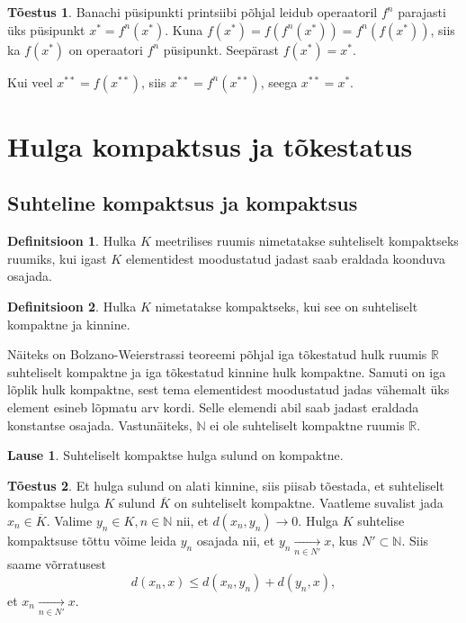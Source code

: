 \documentclass{article}[12pt]
\newcommand{\R}{\mathbb{R}}
\newcommand{\N}{\mathbb{N}}
\theoremstyle{definition}
\newtheorem{definition}{Definitsioon}[section]
\theoremstyle{definition}
\theoremstyle{definition}
\newtheorem{lause}{Lause}[section]
\theoremstyle{break}
\newtheorem*{toestus}{Tõestus}
\begin{document}
\begin{toestus}
	Banachi püsipunkti printsiibi põhjal leidub operaatoril $f^n$ parajasti üks püsipunkt $x^* = f^n(x^*)$.
	Kuna $f(x^*) = f(f^n(x^*)) = f^n(f(x^*))$, siis ka $f(x^*)$ on operaatori $f^n$ püsipunkt. Seepärast $f(x^*) = x^*$.

	Kui veel $x^{**} = f(x^{**})$, siis $x^{**} = f^n(x^{**})$, seega $x^{**} = x^*$.
\end{toestus}

\section{Hulga kompaktsus ja tõkestatus}

\subsection{Suhteline kompaktsus ja kompaktsus}

\begin{definition}
	Hulka $K$ meetrilises ruumis nimetatakse suhteliselt kompaktseks ruumiks, kui igast $K$ elementidest moodustatud jadast saab eraldada koonduva osajada.
\end{definition}

\begin{definition}
	Hulka $K$ nimetatakse kompaktseks, kui see on suhteliselt kompaktne ja kinnine.
\end{definition}

Näiteks on Bolzano-Weierstrassi teoreemi põhjal iga tõkestatud hulk ruumis $\R$ suhteliselt kompaktne ja iga tõkestatud kinnine hulk kompaktne. Samuti on iga lõplik hulk kompaktne, sest tema elementidest moodustatud jadas vähemalt üks element esineb lõpmatu arv kordi. Selle elemendi abil saab jadast eraldada konstantse osajada. Vastunäiteks, $\N$ ei ole suhteliselt kompaktne ruumis $\R$.

\begin{lause}
	Suhteliselt kompaktse hulga sulund on kompaktne.
\end{lause}

\begin{toestus}
	Et hulga sulund on alati kinnine, siis piisab tõestada, et suhteliselt kompaktse hulga $K$ sulund $\overline{K}$ on suhteliselt kompaktne.
	Vaatleme suvalist jada $x_n\in \overline{K}$.
	Valime $y_n\in K,n\in\N$ nii, et $d(x_n,y_n)\rightarrow 0$.
	Hulga $K$ suhtelise kompaktsuse tõttu võime leida $y_n$ osajada nii, et $y_n\xrightarrow[n\in N']{} x$, kus $N'\subset\N$.
	Siis saame võrratusest
	\[
		d(x_n,x) \leq d(x_n,y_n) + d(y_n,x),
	\]
	et $x_n\xrightarrow[n\in N']{} x$.
\end{toestus}
\end{document}
